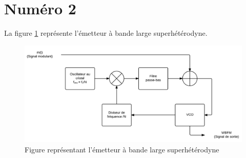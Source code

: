 \section*{Numéro 2}
La figure \ref{schema2} représente l'émetteur à bande large superhétérodyne.

\begin{figure}[htb]
\begin{center}
\includegraphics[scale=0.8]{Q2.png}
\caption{Figure représentant l'émetteur à bande large superhétérodyne}
\label{schema2}
\end{center}
\end{figure}
